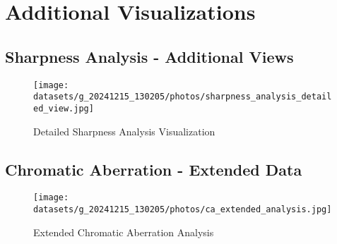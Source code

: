 
\chapter{Additional Visualizations}
\label{app:additional_visuals}

\section{Sharpness Analysis - Additional Views}
\begin{figure}[H]
    \centering
    \texttt{[image: datasets/g\_20241215\_130205/photos/sharpness\_analysis\_detailed\_view.jpg]}
    \caption{Detailed Sharpness Analysis Visualization}
    \label{fig:sharpness_detailed}
\end{figure}

\section{Chromatic Aberration - Extended Data}
\begin{figure}[H]
    \centering
    \texttt{[image: datasets/g\_20241215\_130205/photos/ca\_extended\_analysis.jpg]}
    \caption{Extended Chromatic Aberration Analysis}
    \label{fig:ca_extended}
\end{figure}
